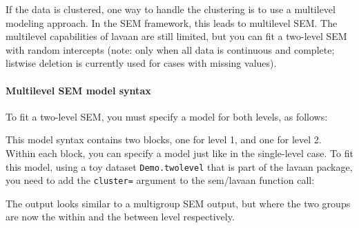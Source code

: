 If the data is clustered, one way to handle the clustering is to use a
multilevel modeling approach. In the SEM framework, this leads to
multilevel SEM. The multilevel capabilities of lavaan are still limited,
but you can fit a two-level SEM with random intercepts (note: only when
all data is continuous and complete; listwise deletion is currently used
for cases with missing values).

\hypertarget{multilevel-sem-model-syntax}{%
\paragraph{Multilevel SEM model
syntax}\label{multilevel-sem-model-syntax}}

To fit a two-level SEM, you must specify a model for both levels, as
follows:

\begin{Shaded}
\begin{Highlighting}[]
\end{Highlighting}
\end{Shaded}

This model syntax contains two blocks, one for level 1, and one for
level 2. Within each block, you can specify a model just like in the
single-level case. To fit this model, using a toy dataset
\texttt{Demo.twolevel} that is part of the lavaan package, you need to
add the \texttt{cluster=} argument to the sem/lavaan function call:

\begin{Shaded}
\begin{Highlighting}[]
\StringTok{ }\NormalTok{(} \NormalTok{)}
\end{Highlighting}
\end{Shaded}

The output looks similar to a multigroup SEM output, but where the two
groups are now the within and the between level respectively.

\begin{Shaded}
\begin{Highlighting}[]
\end{Highlighting}
\end{Shaded}

